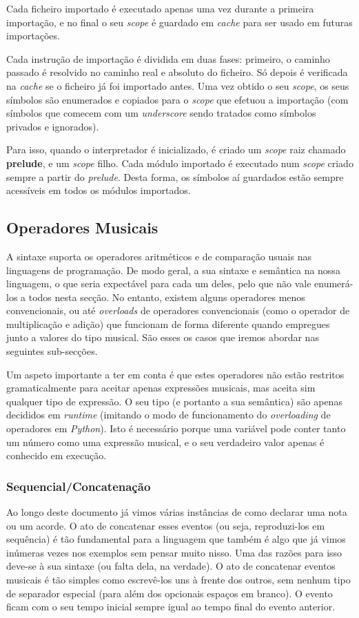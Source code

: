 Cada ficheiro importado é executado apenas uma vez durante a primeira importação, e no final o seu \textit{scope} é guardado em \textit{cache} para ser usado em futuras importações.

Cada instrução de importação é dividida em duas fases: primeiro, o caminho passado é resolvido no caminho real e absoluto do ficheiro. Só depois é verificada na \textit{cache} se o ficheiro já foi importado antes. Uma vez obtido o seu \textit{scope}, os seus símbolos são enumerados e copiados para o \textit{scope} que efetuou a importação (com símbolos que comecem com um \textit{underscore} sendo tratados como símbolos privados e ignorados).

Para isso, quando o interpretador é inicializado, é criado um \textit{scope} raiz chamado \textbf{prelude}, e um \textit{scope} filho. Cada módulo importado é executado num \textit{scope} criado sempre a partir do \textit{prelude}. Desta forma, os símbolos aí guardados estão sempre acessíveis em todos os módulos importados.


\subsection{Operadores Musicais}
A sintaxe suporta os operadores aritméticos e de comparação usuais nas linguagens de programação. De modo geral, a sua sintaxe e semântica na nossa linguagem, o que seria expectável para cada um deles, pelo que não vale enumerá-los a todos nesta secção. No entanto, existem alguns operadores menos convencionais, ou até \textit{overloads} de operadores convencionais (como o operador de multiplicação e adição) que funcionam de forma diferente quando empregues junto a valores do tipo musical. São esses os casos que iremos abordar nas seguintes sub-secções.

Um aspeto importante a ter em conta é que estes operadores não estão restritos gramaticalmente para aceitar apenas expressões musicais, mas aceita sim qualquer tipo de expressão. O seu tipo (e portanto a sua semântica) são apenas decididos em \textit{runtime} (imitando o modo de funcionamento do \textit{overloading} de operadores em \textit{Python}). Isto é necessário porque uma variável pode conter tanto um número como uma expressão musical, e o seu verdadeiro valor apenas é conhecido em execução.

\subsubsection{Sequencial/Concatenação}
Ao longo deste documento já vimos várias instâncias de como declarar uma nota ou um acorde. O ato de concatenar esses eventos (ou seja, reproduzi-los em sequência) é tão fundamental para a linguagem que também é algo que já vimos inúmeras vezes nos exemplos sem pensar muito nisso. Uma das razões para isso deve-se à sua sintaxe (ou falta dela, na verdade). O ato de concatenar eventos musicais é tão simples como escrevê-los uns à frente dos outros, sem nenhum tipo de separador especial (para além dos opcionais espaços em branco). O evento ficam com o seu tempo inicial sempre igual ao tempo final do evento anterior.

